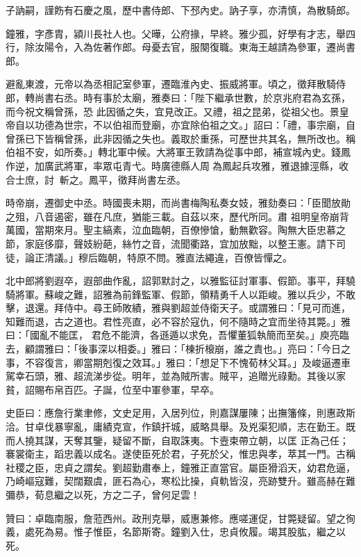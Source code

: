 \begin{pinyinscope}
 子訥嗣，謹飭有石慶之風，歷中書侍郎、下邳內史。訥子享，亦清慎，為散騎郎。



 鐘雅，字彥胄，潁川長社人也。父曄，公府掾，早終。雅少孤，好學有才志，舉四行，除汝陽令，入為佐著作郎。母憂去官，服闋復職。東海王越請為參軍，遷尚書郎。



 避亂東渡，元帝以為丞相記室參軍，遷臨淮內史、振威將軍。頃之，徵拜散騎侍郎，轉尚書右丞。時有事於太廟，雅奏曰：「陛下繼承世數，於京兆府君為玄孫，而今祝文稱曾孫，恐
 此因循之失，宜見改正。又禮，祖之昆弟，從祖父也。景皇帝自以功德為世宗，不以伯祖而登廟，亦宜除伯祖之文。」詔曰：「禮，事宗廟，自曾孫已下皆稱曾孫，此非因循之失也。義取於重孫，可歷世共其名，無所改也。稱伯祖不安，如所奏。」轉北軍中候。大將軍王敦請為從事中郎，補宣城內史。錢鳳作逆，加廣武將軍，率眾屯青弋。時廣德縣人周為鳳起兵攻雅，雅退據涇縣，收合士庶，討，斬之。鳳平，徵拜尚書左丞。



 時帝崩，遷御史中丞。時國喪未期，而尚書梅陶私奏女妓，雅劾奏曰：「臣聞放勛之殂，八音遏密，雖在凡庶，猶能三載。自茲以來，歷代所同。肅
 祖明皇帝崩背萬國，當期來月。聖主縞素，泣血臨朝，百僚慘愴，動無歡容。陶無大臣忠慕之節，家庭侈靡，聲妓紛葩，絲竹之音，流聞衢路，宜加放黜，以整王憲。請下司徒，論正清議。」穆后臨朝，特原不問。雅直法繩違，百僚皆憚之。



 北中郎將劉遐卒，遐部曲作亂，詔郭默討之，以雅監征討軍事、假節。事平，拜驍騎將軍。蘇峻之難，詔雅為前鋒監軍、假節，領精勇千人以距峻。雅以兵少，不敢擊，退還。拜侍中。尋王師敗績，雅與劉超並侍衛天子。或謂雅曰：「見可而進，知難而退，古之道也。君性亮直，必不容於寇仇，何不隨時之宜而坐待其斃。」雅曰：「國亂不能匡，
 君危不能濟，各遜遁以求免，吾懼董狐執簡而至矣。」庾亮臨去，顧謂雅曰：「後事深以相委。」雅曰：「棟折榱崩，誰之責也。」亮曰：「今日之事，不容復言，卿當期剋復之效耳。」雅曰：「想足下不愧荀林父耳。」及峻逼遷車駕幸石頭，雅、超流涕步從。明年，並為賊所害。賊平，追贈光祿勳。其後以家貧，詔賜布帛百匹。子誕，位至中軍參軍，早卒。



 史臣曰：應詹行業聿修，文史足用，入居列位，則嘉謀屢陳；出撫籓條，則惠政斯洽。甘卓伐暴寧亂，庸績克宣，作鎮扞城，威略具舉。及兇渠犯順，志在勤王。既而人撓其謀，天奪其鑒，疑留不斷，自取誅夷。卞壼束帶立朝，以匡
 正為己任；褰裳衛主，蹈忠義以成名。遂使臣死於君，子死於父，惟忠與孝，萃其一門。古稱社稷之臣，忠貞之謂矣。劉超勤肅奉上，鐘雅正直當官。屬臣猾滔天，幼君危逼，乃崎嶇寇難，契闊艱虞，匪石為心，寒松比操，貞軌皆沒，亮跡雙升。雖高赫在難彌恭，荀息繼之以死，方之二子，曾何足雲！



 贊曰：卓臨南服，詹蒞西州。政刑克舉，威惠兼修。應嗟運促，甘斃疑留。望之徇義，處死為易。惟子惟臣，名節斯寄。鐘劉入仕，忠貞攸履。竭其股肱，繼之以死。



\end{pinyinscope}